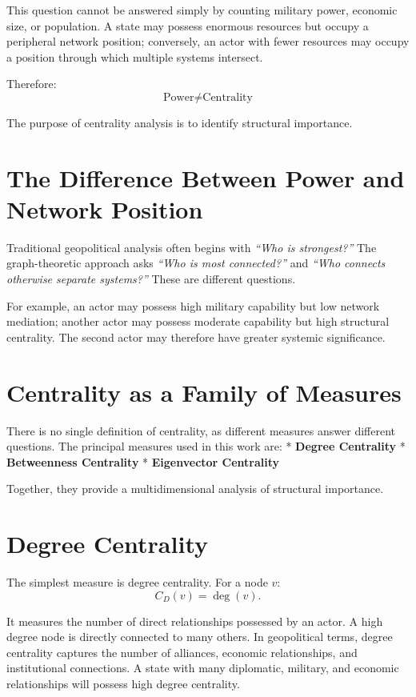 \documentclass[11pt,openany]{book}
\theoremstyle{plain}
\theoremstyle{definition}
\begin{document}
This question cannot be answered simply by counting military power, economic size, or population. A state may possess enormous resources but occupy a peripheral network position; conversely, an actor with fewer resources may occupy a position through which multiple systems intersect. 

Therefore:
\[
\boxed{
\text{Power} \neq \text{Centrality}
}
\]

The purpose of centrality analysis is to identify structural importance.

\section*{The Difference Between Power and Network Position}

Traditional geopolitical analysis often begins with \textit{``Who is strongest?''} The graph-theoretic approach asks \textit{``Who is most connected?''} and \textit{``Who connects otherwise separate systems?''} These are different questions.

For example, an actor may possess high military capability but low network mediation; another actor may possess moderate capability but high structural centrality. The second actor may therefore have greater systemic significance.

\section*{Centrality as a Family of Measures}

There is no single definition of centrality, as different measures answer different questions. The principal measures used in this work are:
* \textbf{Degree Centrality}
* \textbf{Betweenness Centrality}
* \textbf{Eigenvector Centrality}

Together, they provide a multidimensional analysis of structural importance.

\section*{Degree Centrality}

The simplest measure is degree centrality. For a node \(v\):
\[
C_D(v) = \deg(v).
\]

It measures the number of direct relationships possessed by an actor. A high degree node is directly connected to many others. In geopolitical terms, degree centrality captures the number of alliances, economic relationships, and institutional connections. A state with many diplomatic, military, and economic relationships will possess high degree centrality.
\end{document}
